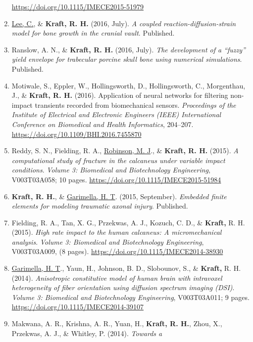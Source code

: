 \documentclass[11pt]{article}
\begin{document}
\begin{enumerate}
  \url{https://doi.org/10.1115/IMECE2015-51979}
\item
  \underline{Lee, C.}, \& \textbf{\textbf{Kraft,} R. 
H.} (2016, July). 
\emph{A coupled
  reaction-diffusion-strain model for bone growth in the cranial vault}.
  Published.
\item
  Ranslow, A. 
N., \& \textbf{\textbf{Kraft,} R. 
H.} (2016, July). 
\emph{The development of
  a ``fuzzy'' yield envelope for trabecular porcine skull bone using
  numerical simulations}. 
Published.
\item
  Motiwale, S., Eppler, W., Hollingsworth, D., Hollingsworth, C.,
  Morgenthau, J., \& \textbf{\textbf{Kraft,} R. 
H.} (2016). 
Application of neural networks
  for filtering non-impact transients recorded from biomechanical
  sensors. 
\emph{Proceedings of the Institute of Electrical and
  Electronic Engineers (IEEE) International Conference on Biomedical and
  Health Informatics}, 204--207.
  \url{https://doi.org/10.1109/BHI.2016.7455870}
\item
  Reddy, S. 
N., Fielding, R. 
A., \underline{Robinson, M. 
J}., \& \textbf{\textbf{Kraft,} R. 
H.}
  (2015). 
\emph{A computational study of fracture in the calcaneus under
  variable impact conditions}. 
\emph{Volume 3: Biomedical and
  Biotechnology Engineering}, V003T03A058; 10 pages.
  \url{https://doi.org/10.1115/IMECE2015-51984}
\item
  \textbf{\textbf{Kraft,} R. 
H.}, \& \underline{Garimella, H. 
T}. 
(2015, September). 
\emph{Embedded
  finite elements for modeling traumatic axonal injury}. 
Published.
\item
  Fielding, R. 
A., Tan, X. 
G., Przekwas, A. 
J., Kozuch, C. 
D., \& \textbf{Kraft,}
  R. 
H. 
(2015). 
\emph{High rate impact to the human calcaneus: A
  micromechanical analysis}. 
\emph{Volume 3: Biomedical and
  Biotechnology Engineering}, V003T03A009, (8 pages).
  \url{https://doi.org/10.1115/IMECE2014-38930}
\item
  \underline{Garimella, H. 
T}., Yaun, H., Johnson, B. 
D., Slobounov, S., \& \textbf{Kraft,}
  R. 
H. 
(2014). 
\emph{Anisotropic constitutive model of human brain with
  intravoxel heterogeneity of fiber orientation using diffusion spectrum
  imaging (DSI)}. 
\emph{Volume 3: Biomedical and Biotechnology
  Engineering}, V003T03A011; 9 pages.
  \url{https://doi.org/10.1115/IMECE2014-39107}
\item
  Makwana, A. 
R., Krishna, A. 
R., Yuan, H., \textbf{\textbf{Kraft,} R. 
H.}, Zhou, X.,
  Przekwas, A. 
J., \& Whitley, P. 
(2014). 
\emph{Towards a
}
\end{enumerate}
\end{document}
